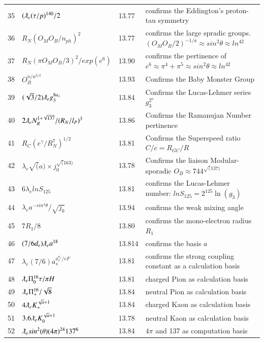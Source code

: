 \documentclass[a4paper,9pt]{article}
\begin{document}
\begin{appendix}
\begin{table}
\begin{tabular}{llll}
    35& $(\lambdabar_{e} (\tau /p)^{140}/2$ & 13.77 & confirms the Eddington's proton-tau symmetry \\
    36& $R_N (O_M O_B/n_{ph})^2$ & 13.77 & confirms the large spradic groups. $(O_M O_B/2)^{-1/a} \approx sin^2\theta \approx ln^42$ \\
    37 & $R_N (\pi O_M O_B/3)^2 / exp(e^6)$ & 13.90 & confirms the pertinence of $e^6 \approx \pi^4 + \pi^5  \approx sin^2\theta \approx ln^42$ \\
    38 & $O_B^{n/ a^{3/2}}$ & 13.93 & Confirms the Baby Monster Group \\
    39 & $(\sqrt{3}/2)\lambdabar_{e}g_3^{8a_s}$ & 13.84 & Confirms the Lucas-Lehmer series $g_ 3^{2^n}$ \\
    40 & $2\lambdabar_{e} N_R^{1+\sqrt{137}}/(R_N/l_P)^3$ & 13.86 & Confirms the Ramanujan Number pertinence \\
    41 & $R_{C} (e^\gamma/R_N^7)^{1/2}$ & 13.81 & Confirms the Superspeed ratio $C/c = R_{GC}/R$\\
    42 & $\lambda_{e} \sqrt(a) \times j_0 ^{\sqrt(163)}$   & 13.78 & Confirms the  liaison Modular-sporadic $O_B \approx 744^{ \sqrt(137)}$ \\ 
    43 & $ 6\lambda_{e} lnS_{125} $   & 13.81 & confirms the Lucas-Lehmer number: $lnS_{125}  = 2^{125} \ln(g_3) $ \\
    44 & $ \lambda_{e} a^{-sin^4\theta}/\sqrt {j_0}  $   & 13.94 & confirms the weak mixing angle \\ 
    45 & $7R_1/8  $   & 13.80 & confirms the mono-electron radius $R_1$ \\ 
    46 & $ (7/6d_e) \lambdabar_{e} a^{18} $ & 13.814 & confirms the basis $a$ \\
    47 & $ \lambda_{e} (7/6) a_s^{a_s^{a_s}/eF}  $   & 13.81 & confirms the strong coupling constant as a calculation basis \\    
    48 & $\lambdabar_{e} \Pi_0^{16} \tau/\pi H $ & 13.81 & charged Pion as calculation basis \\    
    49 & $\lambdabar_{e} \Pi_+^{16} /\sqrt 8 $ & 13.84 &  neutral Pion as calculation basis \\
    50 & $ 4 \lambdabar_{e} K_+^{\sqrt a + 1} $ & 13.84 & charged Kaon as calculation basis \\
    51 & $3.6 \lambdabar_{e} K_0^{\sqrt a + 1}$ & 13.78 & neutral Kaon as calculation basis \\
    
    52 & $ \lambdabar_{e} sin^2(\theta) (4\pi)^{24} 137^6 $ & 13.84 & $4\pi$ and 137 as computation basis \\
    

\end{tabular}
\end{table}
\end{appendix}
\end{document}
